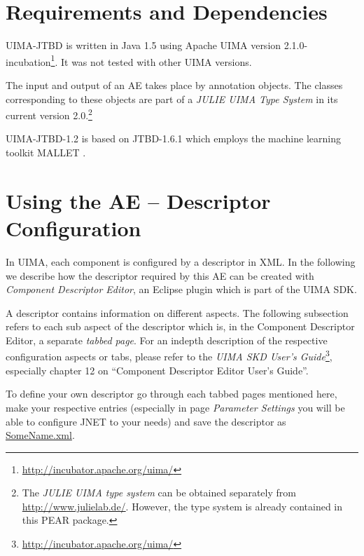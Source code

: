 \documentclass[11pt,a4paper,halfparskip]{scrartcl}
\begin{document}


\section{Requirements and Dependencies}

UIMA-JTBD is written in Java 1.5 using Apache UIMA version
2.1.0-incubation\footnote{\url{http://incubator.apache.org/uima/}}. It
was not tested with other UIMA versions.

The input and output of an AE takes place by annotation objects. The
classes corresponding to these objects are part of a \emph{JULIE UIMA
  Type System} in its current version 2.0.\footnote{The \emph{JULIE UIMA type system} can be
  obtained separately from \url{http://www.julielab.de/}. However, the type system is already contained in this PEAR package.}

UIMA-JTBD-1.2 is based on JTBD-1.6.1 which employs the machine learning
toolkit MALLET \cite{McCallum2002}.




\section{Using the AE -- Descriptor Configuration}

In UIMA, each component is configured by a descriptor in XML. In the
following we describe how the descriptor required by this AE can be
created with \emph{Component Descriptor Editor}, an Eclipse plugin
which is part of the UIMA SDK.

A descriptor contains information on different aspects. The following
subsection refers to each sub aspect of the descriptor which is, in
the Component Descriptor Editor, a separate \emph{tabbed page}. For an
indepth description of the respective configuration aspects or tabs,
please refer to the \emph{UIMA SKD User's
  Guide}\footnote{\url{http://incubator.apache.org/uima/}}, especially
chapter 12 on ``Component Descriptor Editor User's Guide''.

To define your own descriptor go through each tabbed pages mentioned
here, make your respective entries (especially in page \emph{Parameter
  Settings} you will be able to configure JNET to your needs) and save
the descriptor as \url{SomeName.xml}.
\end{document}
